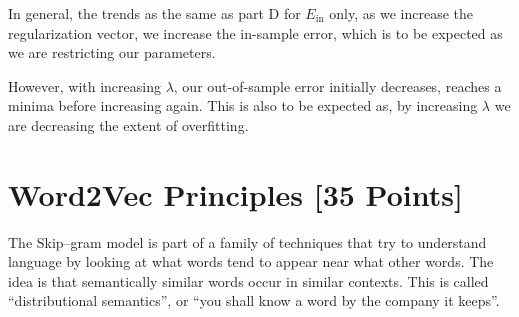 \begin{solution}
	\begin{figure}[H]
	  \end{figure}
	  In general, the trends as the same as part D for $E_\text{in}$ only, as we increase the regularization vector, we increase the in-sample error, which is to be expected as we are restricting our parameters.

	  However, with increasing $\lambda$, our out-of-sample error initially decreases, reaches a minima before increasing again. This is also to be expected as, by increasing $\lambda$ we are decreasing the extent of overfitting. 
\end{solution}






\newpage
\section{Word2Vec Principles [35 Points]}

The Skip--gram model is part of a family of techniques that try to understand language by looking at what words tend to appear near what other words.  The idea is that semantically similar words occur in similar contexts.  This is called ``distributional semantics'', or ``you shall know a word by the company it keeps''.  

